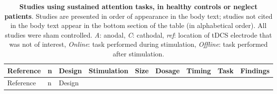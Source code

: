 \documentclass[11pt,]{memoir}
\begin{document}
\begin{longtable}[]{@{}lllllllll@{}}
\caption{\label{tab:sustained-attention} \textbf{Studies using sustained attention tasks, in healthy controls or neglect patients}. Studies are presented in order of appearance in the body text; studies not cited in the body text appear in the bottom section of the table (in alphabetical order). All studies were sham controlled. \emph{A}: anodal, \emph{C}: cathodal, \emph{ref}: location of tDCS electrode that was not of interest, \emph{Online}: task performed during stimulation, \emph{Offline}: task performed after stimulation.}\tabularnewline
\toprule
\begin{minipage}[b]{0.09\columnwidth}\raggedright
Reference\strut
\end{minipage} & \begin{minipage}[b]{0.02\columnwidth}\raggedright
n\strut
\end{minipage} & \begin{minipage}[b]{0.04\columnwidth}\raggedright
Design\strut
\end{minipage} & \begin{minipage}[b]{0.10\columnwidth}\raggedright
Stimulation\strut
\end{minipage} & \begin{minipage}[b]{0.03\columnwidth}\raggedright
Size\strut
\end{minipage} & \begin{minipage}[b]{0.05\columnwidth}\raggedright
Dosage\strut
\end{minipage} & \begin{minipage}[b]{0.06\columnwidth}\raggedright
Timing\strut
\end{minipage} & \begin{minipage}[b]{0.12\columnwidth}\raggedright
Task\strut
\end{minipage} & \begin{minipage}[b]{0.25\columnwidth}\raggedright
Findings\strut
\end{minipage}\tabularnewline
\midrule
\endfirsthead
\toprule
\begin{minipage}[b]{0.09\columnwidth}\raggedright
Reference\strut
\end{minipage} & \begin{minipage}[b]{0.02\columnwidth}\raggedright
n\strut
\end{minipage} & \begin{minipage}[b]{0.04\columnwidth}\raggedright
Design\strut
\end{minipage} & \begin{minipage}[b]{0.10\columnwidth}\raggedright

\end{minipage}
\end{longtable}
\end{document}
